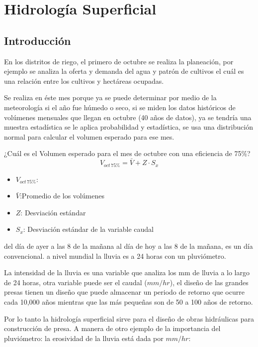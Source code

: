 \chapter{Hidrología Superficial}
\section{Introducción}
En los distritos de riego, el primero de octubre se realiza la planeación, por ejemplo se analiza la oferta y demanda del agua y patrón de cultivos el cuál es una relación entre los cultivos y hectáreas ocupadas.

Se realiza en éste mes porque ya se puede determinar por medio de la meteorología si el año fue húmedo o seco,
si se miden los datos históricos de volúmenes mensuales que llegan en octubre (40 años de datos), ya se tendría una muestra estadística se le aplica probabilidad y estadística, se usa una distribución normal para calcular el volumen esperado para ese mes.

¿Cuál es el Volumen esperado para el mes de octubre con una eficiencia de 75\%?
\begin{equation}
    V_{oct\, 75\%} =\bar{V} + Z\cdot S_x
\end{equation}
\begin{notation}
    \begin{itemize}
        \item $V_{oct\, 75\%}$: 
        \item $\bar{V}$:Promedio de los volúmenes
        \item $Z$: Desviación estándar 
        \item $S_x$: Desviación estándar de la variable caudal
    \end{itemize}
\end{notation}

del día de ayer a las 8 de la mañana al día de hoy a las 8 de la mañana, es un día convencional. a nivel mundial la lluvia es a 24 horas con un pluviómetro.

La intensidad de la lluvia es una variable que analiza los mm de lluvia a lo largo de 24 horas, otra variable puede ser el caudal ($mm/hr$), el diseño de las grandes presas tienen un diseño que puede almacenar un periodo de retorno que ocurre cada 10,000 años mientras que las más pequeñas son de 50 a 100 años de retorno.

Por lo tanto la hidrología superficial sirve para el diseño de obras hidráulicas para construcción de presa. A manera de otro ejemplo de la importancia del pluviómetro:
la erosividad de la lluvia está dada por $mm/hr$:

